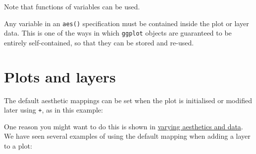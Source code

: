 \begin{Shaded}
\begin{Highlighting}[]
 
\end{Highlighting}
\end{Shaded}

\noindent Note that functions of variables can be used.

Any variable in an \texttt{aes()} specification must be contained inside
the plot or layer data. This is one of the ways in which \texttt{ggplot}
objects are guaranteed to be entirely self-contained, so that they can
be stored and re-used.

\section{Plots and layers}\label{sub:plots-and-layers}

The default aesthetic mappings can be set when the plot is initialised
or modified later using \texttt{+}, as in this example:
 \indexc{+}

\begin{Shaded}
\begin{Highlighting}[]
\NormalTok{>}\StringTok{ }\StringTok{ }
\NormalTok{>}\StringTok{ }
\NormalTok{>}\StringTok{ }
\ErrorTok{>}\StringTok{ }\StringTok{ }\StringTok{ }
\NormalTok{>}\StringTok{ }
\end{Highlighting}
\end{Shaded}

One reason you might want to do this is shown in
\hyperref[sub:different-aesthetics]{varying aesthetics and data}. We
have seen several examples of using the default mapping when adding a
layer to a plot:

\begin{Shaded}
\begin{Highlighting}[]
\NormalTok{>}\StringTok{ }\StringTok{ }\NormalTok{(}  
\NormalTok{>}\StringTok{ }\StringTok{ }\NormalTok{()}
\end{Highlighting}
\end{Shaded}

